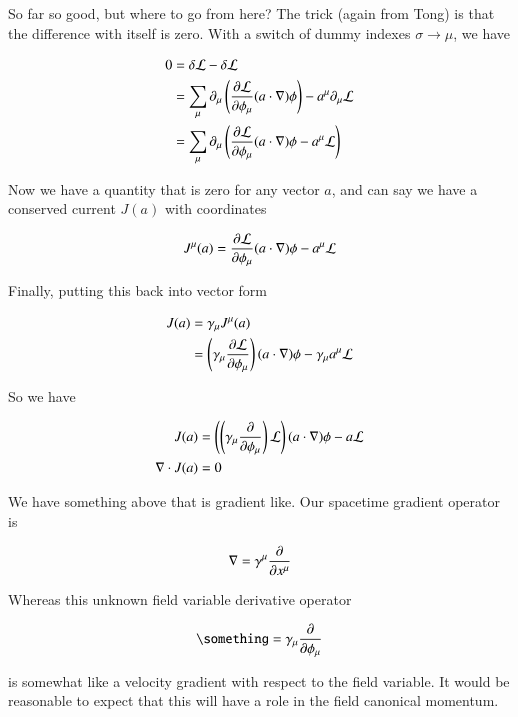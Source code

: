 \documentclass{article}
\begin{document}
So far so good, but where to go from here?  The trick (again from Tong) is that
the difference with itself is zero.  With a switch of dummy indexes $\sigma \rightarrow \mu$, we have

\begin{align*}
0 &=
\delta \mathcal{L} - \delta \mathcal{L}  \\
&= 
\sum_\mu
\partial_\mu
\left(
\frac{\partial {\mathcal{L}}}{\partial {\phi_\mu}}
(a \cdot \nabla) \phi 
\right) -
 a^\mu \partial_\mu \mathcal{L} 
\\
&= 
\sum_\mu
\partial_\mu
\left(
\frac{\partial {\mathcal{L}}}{\partial {\phi_\mu}}
(a \cdot \nabla) \phi 
- a^\mu \mathcal{L} 
\right)
\\
\end{align*}

Now we have a quantity that is zero for any vector $a$, and can say we have
a conserved current $J(a)$ with coordinates

\begin{align}
J^\mu(a)
=
\frac{\partial {\mathcal{L}}}{\partial {\phi_\mu}}
(a \cdot \nabla) \phi 
- a^\mu \mathcal{L} 
\end{align}

Finally, putting this back into vector form

\begin{align*}
J(a) &= \gamma_\mu J^\mu(a) \\
&=
\left( \gamma_\mu \frac{\partial {\mathcal{L}}}{\partial {\phi_\mu}} \right)
(a \cdot \nabla) \phi 
- \gamma_\mu a^\mu \mathcal{L}  \\
\end{align*}

So we have

\begin{align}\label{eqn:vCurrent}
J(a) &= 
\left( \left(\gamma_\mu \frac{\partial {}}{\partial {\phi_\mu}} \right) \mathcal{L} \right)
(a \cdot \nabla) \phi 
- a \mathcal{L}  \\
\nabla \cdot J(a) &= 0
\end{align}

We have something above that is gradient like.  Our spacetime gradient operator is

\begin{align*}
\nabla = \gamma^\mu \frac{\partial {}}{\partial {x^\mu}}
\end{align*}

Whereas this unknown field variable derivative operator

\begin{align*}
\something = \gamma_\mu \PD{\phi_\mu}{}
\end{align*}

is somewhat like a velocity gradient with respect to the field variable.  It would be reasonable to expect that this will have a role in the field canonical momentum.
\end{document}
